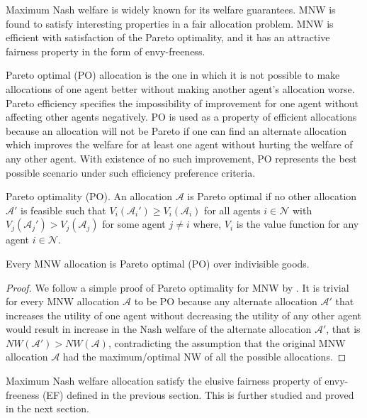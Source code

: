 Maximum Nash welfare is widely known for its welfare guarantees. MNW is found to satisfy interesting properties in a fair allocation problem. MNW is efficient with satisfaction of the Pareto optimality, and it has an attractive fairness property in the form of envy-freeness.

Pareto optimal (PO) allocation is the one in which it is not possible to make allocations of one agent better without making another agent's allocation worse. Pareto efficiency specifies the impossibility of improvement for one agent without affecting other agents negatively. PO is used as a property of efficient allocations because an allocation will not be Pareto if one can find an alternate allocation which improves the welfare for at least one agent without hurting the welfare of any other agent. With existence of no such improvement, PO represents the best possible scenario under such efficiency preference criteria.

\begin{definition}{Pareto optimality (PO).}
An allocation $\mathcal{A}$ is Pareto optimal if no other allocation $\mathcal{A'}$ is feasible such that $V_i(\mathcal{A}_i') \geq V_i(\mathcal{A}_i)$ for all agents $i \in \mathcal{N}$ with $ V_j(\mathcal{A}_j') > V_j(\mathcal{A}_j)$ for some agent $j \neq i$ where, $V_i$ is the value function for any agent $i \in \mathcal{N}$.
\end{definition}

\begin{theorem}
Every MNW allocation is Pareto optimal (PO) over indivisible goods.
\end{theorem}

\begin{proof}
We follow a simple proof of Pareto optimality for MNW by \citet{caragiannis2016unreasonable}. It is trivial for every MNW allocation $\mathcal{A}$ to be PO because any alternate allocation $\mathcal{A}'$ that increases the utility of one agent without decreasing the utility of any other agent would result in increase in the Nash welfare of the alternate allocation $\mathcal{A}'$, that is $NW(\mathcal{A}') > NW(\mathcal{A})$, contradicting the assumption that the original MNW allocation $\mathcal{A}$ had the maximum/optimal NW of all the possible allocations. 
\end{proof}

Maximum Nash welfare allocation satisfy the elusive fairness property of envy-freeness (EF) defined in the previous section. This is further studied and proved in the next section.

